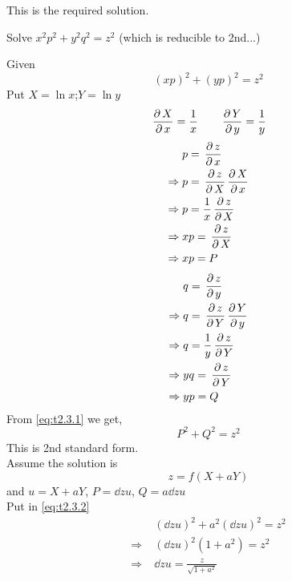 \documentclass[../main-sheet.tex]{subfiles}
\begin{document}
\begin{enumerate}[label=\underline{Type - \Roman*}:]
\begin{soln}
            This is the required solution.
        \end{soln}
        \begin{prob}
            Solve \(x^2p^2+y^2q^2=z^2\) (which is reducible to 2nd...)
        \end{prob}
        \begin{soln}
            Given
            \begin{equation}
                (xp)^2+(yp)^2=z^2\label{eq:t2.3.1}
            \end{equation}
            Put \(X=\ln x\);\quad \(Y=\ln y\)\\
            \[\,\frac{\partial\, X}{\partial\, x}=\frac{1}{x}\qquad\,\frac{\partial\, Y}{\partial\, y}=\frac{1}{y}\]
            \begin{align*}
                &p=\,\frac{\partial\, z}{\partial\, x}\\
                \Rightarrow\;&p=\,\frac{\partial\, z}{\partial\, X}\,\frac{\partial\, X}{\partial\, x}\\
                \Rightarrow\;&p=\frac{1}{x}\,\frac{\partial\, z}{\partial\, X}\\
                \Rightarrow\;&xp=\,\frac{\partial\, z}{\partial\, X}\\
                \Rightarrow\;&xp=P
            \end{align*}
            \begin{align*}
                &q=\,\frac{\partial\, z}{\partial\, y}\\
                \Rightarrow\;&q=\,\frac{\partial\, z}{\partial\, Y}\,\frac{\partial\, Y}{\partial\, y}\\
                \Rightarrow\;&q=\frac{1}{y}\,\frac{\partial\, z}{\partial\, Y}\\
                \Rightarrow\;&yq=\,\frac{\partial\, z}{\partial\, Y}\\
                \Rightarrow\;&yp=Q
            \end{align*}
            From \eqref{eq:t2.3.1} we get,
            \begin{equation}
                P^2+Q^2=z^2\label{eq:t2.3.2}
            \end{equation}
            This is 2nd standard form.\\
            Assume the solution is\[z=f(X+aY)\] and \(u=X+aY\), \(P=\displaystyle \dd{z}{u}\), \(Q=\displaystyle a\dd{z}{u}\)\\
            Put in \eqref{eq:t2.3.2}
            \begin{align*}
                &\left( \dd{z}{u} \right)^2+a^2\left( \dd{z}{u} \right)^2=z^2\\
                \Rightarrow\;&\left( \dd{z}{u} \right)^2(1+a^2)=z^2\\
                \Rightarrow\;&\dd{z}{u}=\frac{z}{\sqrt{1+a^2}}\\

\end{align*}
\end{soln}
\end{enumerate}
\end{document}

